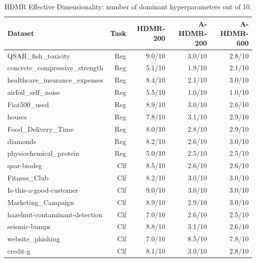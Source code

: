 \begin{table}[t]
\centering
\caption{HDMR Effective Dimensionality: number of dominant hyperparameters out of 10.}
\label{tab:sensitivity}
\begin{tabular}{lrrrr}
\toprule
\textbf{Dataset} & \textbf{Task} & \textbf{HDMR-200} & \textbf{A-HDMR-200} & \textbf{A-HDMR-600} \\
\midrule
QSAR_fish_toxicity & Reg & 9.0/10 & 3.0/10 & 2.8/10 \\
concrete_compressive_strength & Reg & 5.1/10 & 1.9/10 & 2.1/10 \\
healthcare_insurance_expenses & Reg & 8.4/10 & 2.1/10 & 3.0/10 \\
airfoil_self_noise & Reg & 5.5/10 & 1.0/10 & 1.0/10 \\
Fiat500_used & Reg & 8.9/10 & 3.0/10 & 2.6/10 \\
houses & Reg & 7.8/10 & 3.1/10 & 2.9/10 \\
Food_Delivery_Time & Reg & 8.0/10 & 2.8/10 & 2.9/10 \\
diamonds & Reg & 8.2/10 & 2.6/10 & 3.0/10 \\
physiochemical_protein & Reg & 5.0/10 & 2.5/10 & 2.5/10 \\
qsar-biodeg & Clf & 8.5/10 & 2.6/10 & 2.6/10 \\
Fitness_Club & Clf & 8.2/10 & 3.0/10 & 3.0/10 \\
Is-this-a-good-customer & Clf & 9.0/10 & 3.0/10 & 3.0/10 \\
Marketing_Campaign & Clf & 8.9/10 & 2.9/10 & 3.0/10 \\
hazelnut-contaminant-detection & Clf & 7.0/10 & 2.6/10 & 2.5/10 \\
seismic-bumps & Clf & 8.8/10 & 3.1/10 & 2.6/10 \\
website_phishing & Clf & 7.0/10 & 8.5/10 & 7.8/10 \\
credit-g & Clf & 8.1/10 & 3.0/10 & 2.8/10 \\
\bottomrule
\end{tabular}
\end{table}